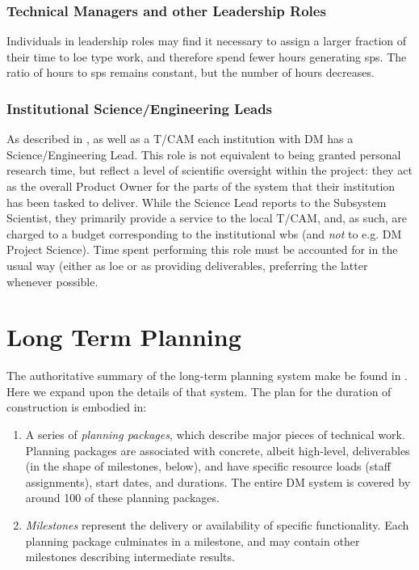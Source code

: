 \subsubsection{Technical Managers and other Leadership Roles}

Individuals in leadership roles may find it necessary to assign a larger fraction of their time to \gls{loe} type work, and therefore spend fewer hours generating \glspl{sp}.
The ratio of hours to \glspl{sp} remains constant, but the number of hours decreases.

\subsubsection{Institutional Science/Engineering Leads}

As described in , as well as a T/CAM each institution with DM has a Science/Engineering Lead.
This role is not equivalent to being granted personal research time, but reflect a level of scientific oversight within the project: they act as the overall Product Owner for the parts of the system that their institution has been tasked to deliver.
While the Science Lead reports to the Subsystem Scientist, they primarily provide a service to the local T/CAM, and, as such, are charged to a budget corresponding to the institutional \gls{wbs} (and \textit{not} to e.g. DM Project Science).
Time spent performing this role must be accounted for in the usual way (either as \gls{loe} or as providing deliverables, preferring the latter whenever possible.

\section{Long Term Planning}
\label{sec:long-term-plan}

The authoritative summary of the long-term planning system make be found in .
Here we expand upon the details of that system.
The plan for the duration of construction is embodied in:

\begin{enumerate}
\item
  A series of \emph{planning packages}, which describe major pieces of
  technical work. Planning packages are associated with concrete, albeit
  high-level, deliverables (in the shape of milestones, below), and have
  specific resource loads (staff assignments), start dates, and
  durations. The entire DM system is covered by around 100 of these
  planning packages.
\item
  \emph{Milestones} represent the delivery or availability of specific
  functionality. Each planning package culminates in a milestone, and
  may contain other milestones describing intermediate results.
\end{enumerate}

